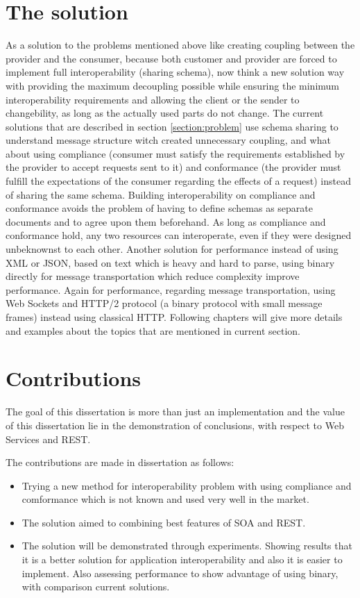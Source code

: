 \section{The solution}
\label{section:solution}

As a solution to the problems mentioned above like creating coupling between the provider and the consumer, because both customer and provider are forced to implement full interoperability (sharing schema), now think a new solution way with providing the maximum decoupling possible while ensuring the minimum interoperability requirements and allowing the client or the sender to changebility, as long as the actually used parts do not change. The current solutions that are described in section \ref{section:problem} use schema sharing to understand message structure witch created unnecessary coupling, and what about using compliance (consumer must satisfy the requirements established by the provider to accept requests sent to it)\citep{compliance:def} and conformance (the provider must fulfill the expectations of the consumer regarding the effects of a request)\citep{comformance:def2} instead of sharing the same schema. Building interoperability on compliance and conformance avoids the problem of having to define schemas as separate documents and to agree upon them beforehand. As long as compliance and conformance hold, any two resources can interoperate, even if they were designed unbeknownst to each other. Another solution for performance instead of using XML or JSON, based on text which is heavy and hard to parse, using binary directly for message transportation which reduce complexity improve performance. Again for performance, regarding message transportation, using Web Sockets and HTTP/2 protocol (a binary protocol with small message frames) instead using classical HTTP. Following chapters will give more details and examples about the topics that are mentioned in current section.

\section{Contributions}
\label{section:contributions}
The goal of this dissertation is more than just an implementation and the value of this dissertation lie in the demonstration of conclusions, with respect to Web Services and REST.

The contributions are made in dissertation as follows:

\begin{itemize}
  \item Trying a new method for interoperability problem with using compliance and comformance which is not known and used very well in the market.
  \item The solution aimed to combining best features of SOA and REST.
  \item The solution will be demonstrated through experiments. Showing results that it is a better solution for application interoperability and also it is easier to implement. Also assessing performance to show advantage of using binary, with comparison current solutions.
\end{itemize}

